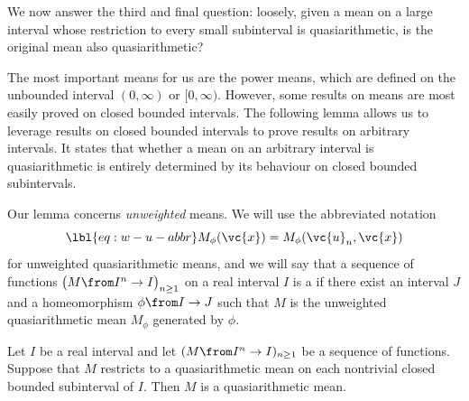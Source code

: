 We now answer the third and final question: loosely, given a mean on a
large interval whose restriction to every small subinterval is
quasiarithmetic, is the original mean also quasiarithmetic?

The most important means for us are the power means, which are defined on
the unbounded interval $(0, \infty)$ or $[0, \infty)$.  However, some
results on means are most easily proved on closed bounded intervals.  The
following lemma allows us to leverage results on closed bounded intervals
to prove results on arbitrary intervals.  It states that whether a mean
on an arbitrary interval is quasiarithmetic is entirely determined by
its behaviour on closed bounded subintervals.

Our lemma concerns \emph{unweighted} means.  We will use
the abbreviated notation
% 
\begin{equation}
\lbl{eq:w-u-abbr}
M_\phi(\vc{x}) = M_\phi(\vc{u}_n, \vc{x})
\end{equation}
% 
for unweighted quasiarithmetic means, and we will say that a sequence of
functions $\bigl( M \from I^n \to I \bigr)_{n \geq 1}$ on a real interval
$I$ is a 
 if there exist an interval $J$ and a homeomorphism $\phi \from I \to
J$ such that $M$ is the unweighted quasiarithmetic mean $M_\phi$ generated
by $\phi$.

\begin{lemma}
Let $I$ be a real interval and let $(M \from I^n \to I)_{n \geq 1}$ be a
sequence of functions.  Suppose that $M$ restricts to a quasiarithmetic
mean on each nontrivial closed bounded subinterval of $I$.  Then $M$ is a
quasiarithmetic mean. 
\end{lemma}


